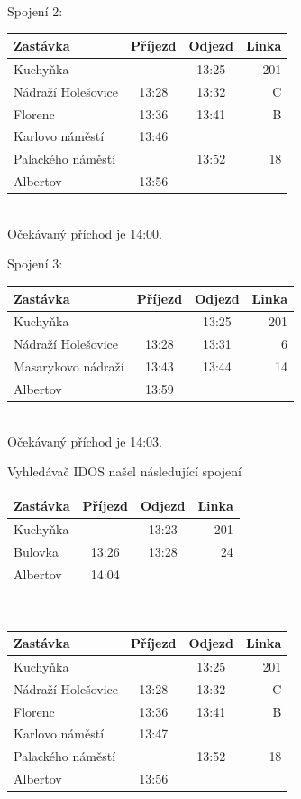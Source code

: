 Spojení 2:\\[2mm]
\begin{tabular}{|l|c|c|r|}\hline
{\bf Zastávka}&{\bf Příjezd}&{\bf Odjezd}&{\bf Linka}\\\hline
Kuchyňka&&13:25&201\\\hline
Nádraží Holešovice&13:28&13:32&C\\\hline
Florenc&13:36&13:41&B\\\hline
Karlovo náměstí&13:46&&\\\hline
Palackého náměstí&&13:52&18\\\hline
Albertov&13:56&&\\\hline
\end{tabular} \\[2mm]
Očekávaný příchod je 14:00.

Spojení 3:\\[2mm]
\begin{tabular}{|l|c|c|r|}\hline
{\bf Zastávka}&{\bf Příjezd}&{\bf Odjezd}&{\bf Linka}\\\hline
Kuchyňka&&13:25&201\\\hline
Nádraží Holešovice&13:28&13:31&6\\\hline
Masarykovo nádraží&13:43&13:44&14\\\hline
Albertov&13:59&&\\\hline
\end{tabular}\\[2mm]
Očekávaný příchod je 14:03.

Vyhledávač IDOS našel následující spojení\\
\begin{tabular}{|l|c|c|r|}\hline
{\bf Zastávka}&{\bf Příjezd}&{\bf Odjezd}&{\bf Linka}\\\hline
Kuchyňka&&13:23&201\\\hline
Bulovka&13:26&13:28&24\\\hline
Albertov&14:04&&\\\hline
\end{tabular}\\
\begin{tabular}{|l|c|c|r|}\hline
{\bf Zastávka}&{\bf Příjezd}&{\bf Odjezd}&{\bf Linka}\\\hline
Kuchyňka&&13:25&201\\\hline
Nádraží Holešovice&13:28&13:32&C\\\hline
Florenc&13:36&13:41&B\\\hline
Karlovo náměstí&13:47&&\\\hline
Palackého náměstí&&13:52&18\\\hline
Albertov&13:56&&\\\hline
\end{tabular} 


